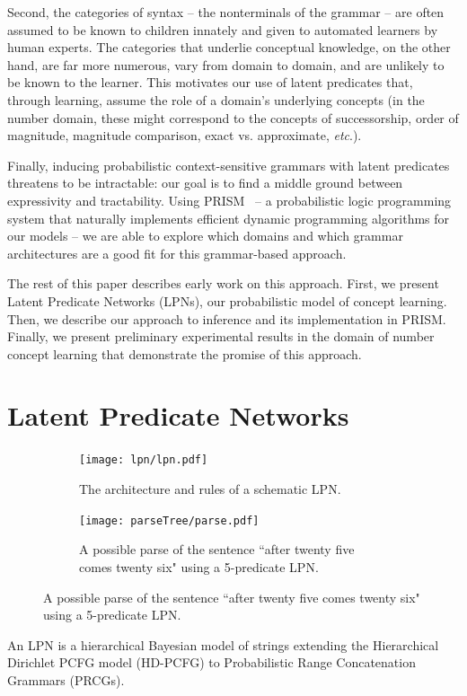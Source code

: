 \documentclass{article} %
\begin{document}
Second, the categories of syntax -- the nonterminals of the grammar --
are often assumed to be known to children innately and given to
automated learners by human experts. The categories that underlie
conceptual knowledge, on the other hand, are far more numerous, vary
from domain to domain, and are unlikely to be known to the
learner. This motivates our use of latent predicates that, through
learning, assume the role of a domain's underlying concepts (in the
number domain, these might correspond to the concepts of
successorship, order of magnitude, magnitude comparison, exact
vs. approximate, {\it etc}.).

Finally, inducing probabilistic context-sensitive grammars with latent
predicates threatens to be intractable: our goal is to find a middle
ground between expressivity and tractability. Using
PRISM~\cite{DBLP:journals/jair/SatoK01} -- a probabilistic logic
programming system that naturally implements efficient dynamic
programming algorithms for our models -- we are able to explore which
domains and which grammar architectures are a good fit for this
grammar-based approach.

The rest of this paper describes early work on this approach. First,
we present Latent Predicate Networks (LPNs), our probabilistic model
of concept learning. Then, we describe our approach to inference and
its implementation in PRISM. Finally, we present preliminary
experimental results in the domain of number concept learning that
demonstrate the promise of this approach.

\section{Latent Predicate Networks}

\begin{figure}[t]
  \begin{subfigure}[b]{0.5\linewidth}
    \texttt{[image: lpn/lpn.pdf]}
    \caption{The architecture and rules of a schematic LPN.}
    \label{fig:architecture}
  \end{subfigure}
  \hfill
  \begin{subfigure}[b]{0.5\linewidth}
    \texttt{[image: parseTree/parse.pdf]}
    \caption{A possible parse of the sentence ``after twenty five comes twenty six" using a 5-predicate LPN.}
    \label{fig:parseexample}
  \end{subfigure}
\end{figure}

An LPN is a hierarchical Bayesian model of strings
extending the Hierarchical Dirichlet PCFG model (HD-PCFG) to
Probabilistic Range Concatenation Grammars (PRCGs). 
\end{document}
